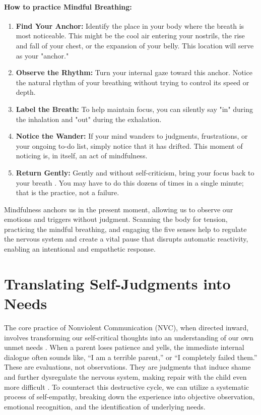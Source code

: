 \paragraph{How to practice Mindful Breathing:}
\begin{enumerate}
    \item \textbf{Find Your Anchor:} Identify the place in your body where the breath is most noticeable. 
    This might be the cool air entering your nostrils, the rise and fall of your chest, or the expansion of your belly. 
    This location will serve as your "anchor."
    \item \textbf{Observe the Rhythm:} Turn your internal gaze toward this anchor. 
    Notice the natural rhythm of your breathing without trying to control its speed or depth.
    \item \textbf{Label the Breath:} To help maintain focus, you can silently say "in" during the inhalation and "out" during the exhalation.
    \item \textbf{Notice the Wander:} If your mind wanders to judgments, frustrations, or your ongoing to-do list, simply notice that it has drifted. 
    This moment of noticing is, in itself, an act of mindfulness.
    \item \textbf{Return Gently:} Gently and without self-criticism, bring your focus back to your breath \citep{neff2003}. 
    You may have to do this dozens of times in a single minute; that is the practice, not a failure.
\end{enumerate}

\begin{keyinsight}
Mindfulness anchors us in the present moment, allowing us to observe our emotions and triggers without judgment.
Scanning the body for tension, practicing the mindful breathing, and engaging the five senses help to regulate the nervous system and create a vital pause that disrupts automatic reactivity, enabling an intentional and empathetic response.
\end{keyinsight}

\section{Translating Self-Judgments into Needs}

The core practice of Nonviolent Communication (NVC), when directed inward, involves transforming our self-critical thoughts into an understanding of our own unmet needs \citep{rosenberg2003}.
When a parent loses patience and yells, the immediate internal dialogue often sounds like, ``I am a terrible parent,'' or ``I completely failed them.''
These are evaluations, not observations.
They are judgments that induce shame and further dysregulate the nervous system, making repair with the child even more difficult \citep{brown2012}.
To counteract this destructive cycle, we can utilize a systematic process of self-empathy, breaking down the experience into objective observation, emotional recognition, and the identification of underlying needs.

